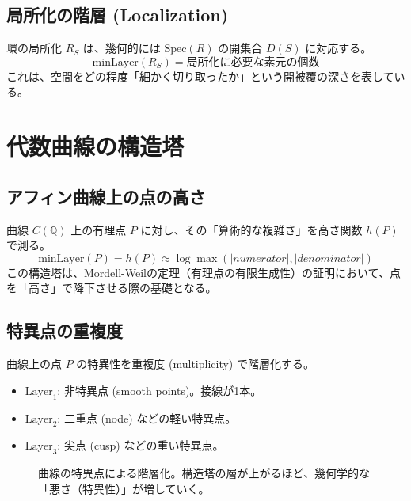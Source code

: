 \documentclass[a4paper,11pt]{ltjsarticle}
\theoremstyle{definition}
\newcommand{\Q}{\mathbb{Q}}
\newcommand{\Spec}{\mathrm{Spec}}
\newcommand{\Layer}[1]{\mathrm{Layer}_{#1}}
\newcommand{\MinLayer}{\mathrm{minLayer}}
\begin{document}
\subsection{局所化の階層 (Localization)}
環の局所化 $R_S$ は、幾何的には $\Spec(R)$ の開集合 $D(S)$ に対応する。
\[ \MinLayer(R_S) = \text{局所化に必要な素元の個数} \]
これは、空間をどの程度「細かく切り取ったか」という開被覆の深さを表している。

\section{代数曲線の構造塔}

\subsection{アフィン曲線上の点の高さ}
曲線 $C(\Q)$ 上の有理点 $P$ に対し、その「算術的な複雑さ」を高さ関数 $h(P)$ で測る。
\[ \MinLayer(P) = h(P) \approx \log \max(|numerator|, |denominator|) \]
この構造塔は、Mordell-Weilの定理（有理点の有限生成性）の証明において、点を「高さ」で降下させる際の基礎となる。

\subsection{特異点の重複度}
曲線上の点 $P$ の特異性を重複度 (multiplicity) で階層化する。
\begin{itemize}
    \item $\Layer{1}$: 非特異点 (smooth points)。接線が1本。
    \item $\Layer{2}$: 二重点 (node) などの軽い特異点。
    \item $\Layer{3}$: 尖点 (cusp) などの重い特異点。
\end{itemize}

\begin{figure}[h]
\centering
{}
\caption{曲線の特異点による階層化。構造塔の層が上がるほど、幾何学的な「悪さ（特異性）」が増していく。}
\end{figure}
\end{document}
